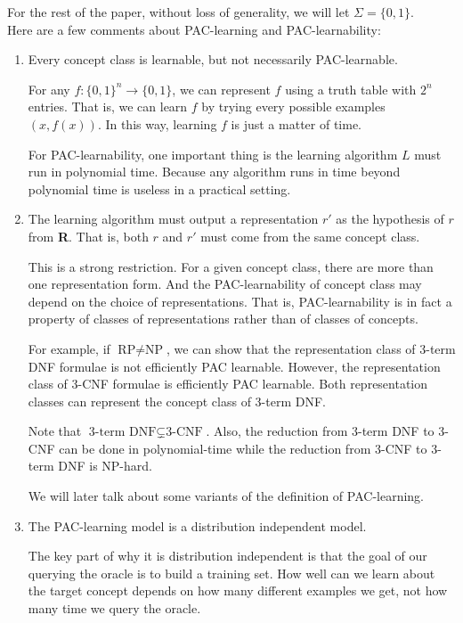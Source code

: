 \documentclass[12pt]{article}
\begin{document}
For the rest of the paper, without loss of generality, we will let $\Sigma = \{ 0, 1 \}$. \\

Here are a few comments about PAC-learning and PAC-learnability:

\begin{enumerate}
  \item Every concept class is learnable, but not necessarily PAC-learnable.

    For any $f: \{0, 1 \}^n \rightarrow \{0, 1\}$, we can represent $f$ using a truth table with $2^n$ entries. That is, we can learn $f$ by trying every possible examples $(x, f(x))$. In this way, learning $f$ is just a matter of time.

    For PAC-learnability, one important thing is the learning algorithm $L$ must run in polynomial time. Because any algorithm runs in time beyond polynomial time is useless in a practical setting.

  \item The learning algorithm must output a representation $r'$ as the hypothesis of $r$ from {\bf R}. That is, both $r$ and $r'$ must come from the same concept class.

    This is a strong restriction. For a given concept class, there are more than one representation form. And the PAC-learnability of concept class may depend on the choice of representations. That is, PAC-learnability is in fact a property of classes of representations rather than of classes of concepts.

    For example, if $\text {RP} \neq \text {NP}$, we can show that the representation class of 3-term DNF formulae is not efficiently PAC learnable. However, the representation class of 3-CNF formulae is efficiently PAC learnable. Both representation classes can represent the concept class of 3-term DNF. 
    
    Note that $\text {3-term DNF} \subsetneq \text {3-CNF}$. Also, the reduction from 3-term DNF to 3-CNF can be done in polynomial-time while the reduction from 3-CNF to 3-term DNF is NP-hard.

    We will later talk about some variants of the definition of PAC-learning.

  \item The PAC-learning model is a distribution independent model.
    
    The key part of why it is distribution independent is that the goal of our querying the oracle is to build a training set. How well can we learn about the target concept depends on how many different examples we get, not how many time we query the oracle.


\end{enumerate}
\end{document}
